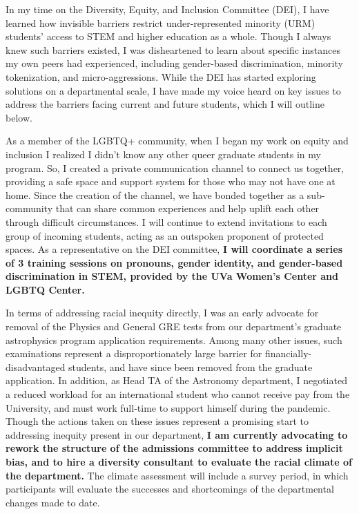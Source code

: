 \documentclass[11pt]{article}
\begin{document}
In my time on the Diversity, Equity, and Inclusion Committee (DEI), I have learned how invisible barriers restrict under-represented minority (URM) students' access to STEM and higher education as a whole. Though I always knew such barriers existed, I was disheartened to learn about specific instances my own peers had experienced, including gender-based discrimination, minority tokenization, and micro-aggressions. While the DEI has started exploring solutions on a departmental scale, I have made my voice heard on key issues to address the barriers facing current and future students, which I will outline below.

As a member of the LGBTQ+ community, when I began my work on equity and inclusion I realized I didn't know any other queer graduate students in my program. So, I created a private communication channel to connect us together, providing a safe space and support system for those who may not have one at home. Since the creation of the channel, we have bonded together as a sub-community that can share common experiences and help uplift each other through difficult circumstances. I will continue to extend invitations to each group of incoming students, acting as an outspoken proponent of protected spaces. As a representative on the DEI committee, \textbf{I will coordinate a series of 3 training sessions on pronouns, gender identity, and gender-based discrimination in STEM, provided by the UVa Women's Center and LGBTQ Center.}

In terms of addressing racial inequity directly, I was an early advocate for removal of the Physics and General GRE tests from our department's graduate astrophysics program application requirements. Among many other issues, such examinations represent a disproportionately large barrier for financially-disadvantaged students, and have since been removed from the graduate application. In addition, as Head TA of the Astronomy department, I negotiated a reduced workload for an international student who cannot receive pay from the University, and must work full-time to support himself during the pandemic. Though the actions taken on these issues represent a promising start to addressing inequity present in our department, \textbf{I am currently advocating to rework the structure of the admissions committee to address implicit bias, and to hire a diversity consultant to evaluate the racial climate of the department.} The climate assessment will include a survey period, in which participants will evaluate the successes and shortcomings of the departmental changes made to date.
\end{document}
